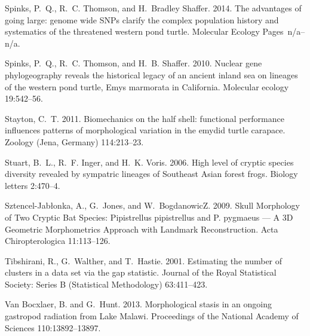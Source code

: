 \documentclass[12pt,letterpaper]{article}
\begin{document}
\begin{thebibliography}{77}
    Spinks, P.~Q., R.~C. Thomson, and H.~{Bradley Shaffer}. 2014. {The advantages
      of going large: genome wide SNPs clarify the complex population history and
    systematics of the threatened western pond turtle}. Molecular Ecology
    Pages~n/a--n/a.

    Spinks, P.~Q., R.~C. Thomson, and H.~B. Shaffer. 2010. {Nuclear gene
      phylogeography reveals the historical legacy of an ancient inland sea on
    lineages of the western pond turtle, Emys marmorata in California.} Molecular
    ecology 19:542--56.

    Stayton, C.~T. 2011. {Biomechanics on the half shell: functional performance
      influences patterns of morphological variation in the emydid turtle
    carapace.} Zoology (Jena, Germany) 114:213--23.

    Stuart, B.~L., R.~F. Inger, and H.~K. Voris. 2006. {High level of cryptic
      species diversity revealed by sympatric lineages of Southeast Asian forest
    frogs.} Biology letters 2:470--4.

    Sztencel-Jabłonka, A., G.~Jones, and W.~BogdanowicZ. 2009. {Skull Morphology
      of Two Cryptic Bat Species: Pipistrellus pipistrellus and P. pygmaeus — A
    3D Geometric Morphometrics Approach with Landmark Reconstruction}. Acta
    Chiropterologica 11:113--126.

    Tibshirani, R., G.~Walther, and T.~Hastie. 2001. {Estimating the number of
    clusters in a data set via the gap statistic}. Journal of the Royal
    Statistical Society: Series B (Statistical Methodology) 63:411--423.

    {Van Bocxlaer}, B. and G.~Hunt. 2013. {Morphological stasis in an ongoing
    gastropod radiation from Lake Malawi}. Proceedings of the National Academy of
    Sciences 110:13892--13897.
    

\end{thebibliography}
\end{document}
